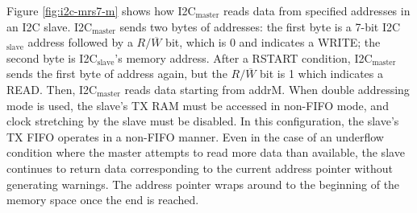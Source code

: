 \documentclass[main\_\_EN.tex]{subfiles}
\begin{document}
Figure \ref{fig:i2c-mrs7-m} shows how I2C$_\text{master}$ reads data from specified addresses in an I2C slave. I2C$_\text{master}$ sends two bytes of addresses: the first byte is a 7-bit I2C$_\text{slave}$ address followed by a $R/\overline W$ bit, which is 0 and indicates a WRITE; the second byte is I2C$_\text{slave}$'s memory address. After a RSTART condition, I2C$_\text{master}$ sends the first byte of address again, but the $R/\overline W$ bit is 1 which indicates a READ. Then, I2C$_\text{master}$ reads data starting from addrM. When double addressing mode is used, the slave's TX RAM must be accessed in non-FIFO mode, and clock stretching by the slave must be disabled. In this configuration, the slave's TX FIFO operates in a non-FIFO manner. Even in the case of an underflow condition where the master attempts to read more data than available, the slave continues to return data corresponding to the current address pointer without generating warnings. The address pointer wraps around to the beginning of the memory space once the end is reached.
\end{document}
